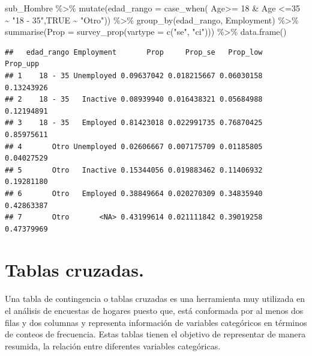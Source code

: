\documentclass[
  12pt,
]{book}
\newenvironment{Shaded}{\begin{snugshade}}{\end{snugshade}}
\newcommand{\AttributeTok}[1]{\textcolor[rgb]{0.77,0.63,0.00}{#1}}
\newcommand{\ConstantTok}[1]{\textcolor[rgb]{0.00,0.00,0.00}{#1}}
\newcommand{\DecValTok}[1]{\textcolor[rgb]{0.00,0.00,0.81}{#1}}
\newcommand{\FunctionTok}[1]{\textcolor[rgb]{0.00,0.00,0.00}{#1}}
\newcommand{\NormalTok}[1]{#1}
\newcommand{\SpecialCharTok}[1]{\textcolor[rgb]{0.00,0.00,0.00}{#1}}
\newcommand{\StringTok}[1]{\textcolor[rgb]{0.31,0.60,0.02}{#1}}
\begin{document}
\begin{Shaded}
\begin{Highlighting}[]
\NormalTok{sub\_Hombre }\SpecialCharTok{\%\textgreater{}\%} \FunctionTok{mutate}\NormalTok{(}\AttributeTok{edad\_rango =} \FunctionTok{case\_when}\NormalTok{(}
\NormalTok{                      Age}\SpecialCharTok{\textgreater{}=} \DecValTok{18} \SpecialCharTok{\&}\NormalTok{ Age }\SpecialCharTok{\textless{}=}\DecValTok{35}  \SpecialCharTok{\textasciitilde{}} \StringTok{"18 {-} 35"}\NormalTok{,}\ConstantTok{TRUE} \SpecialCharTok{\textasciitilde{}} \StringTok{"Otro"}\NormalTok{)) }\SpecialCharTok{\%\textgreater{}\%}
                      \FunctionTok{group\_by}\NormalTok{(edad\_rango, Employment) }\SpecialCharTok{\%\textgreater{}\%} 
                      \FunctionTok{summarise}\NormalTok{(}\AttributeTok{Prop =} \FunctionTok{survey\_prop}\NormalTok{(}\AttributeTok{vartype =}  \FunctionTok{c}\NormalTok{(}\StringTok{"se"}\NormalTok{, }\StringTok{"ci"}\NormalTok{))) }\SpecialCharTok{\%\textgreater{}\%} 
                      \FunctionTok{data.frame}\NormalTok{()}
\end{Highlighting}
\end{Shaded}

\begin{verbatim}
##   edad_rango Employment       Prop     Prop_se   Prop_low   Prop_upp
## 1    18 - 35 Unemployed 0.09637042 0.018215667 0.06030158 0.13243926
## 2    18 - 35   Inactive 0.08939940 0.016438321 0.05684988 0.12194891
## 3    18 - 35   Employed 0.81423018 0.022991735 0.76870425 0.85975611
## 4       Otro Unemployed 0.02606667 0.007175709 0.01185805 0.04027529
## 5       Otro   Inactive 0.15344056 0.019883462 0.11406932 0.19281180
## 6       Otro   Employed 0.38849664 0.020270309 0.34835940 0.42863387
## 7       Otro       <NA> 0.43199614 0.021111842 0.39019258 0.47379969
\end{verbatim}

\hypertarget{tablas-cruzadas.}{%
\section{Tablas cruzadas.}\label{tablas-cruzadas.}}

Una tabla de contingencia o tablas cruzadas es una herramienta muy utilizada en el análisis de encuestas de hogares puesto que, está conformada por al menos dos filas y dos columnas y representa información de variables categóricos en términos de conteos de frecuencia. Estas tablas tienen el objetivo de representar de manera resumida, la relación entre diferentes variables categóricas.
\end{document}
